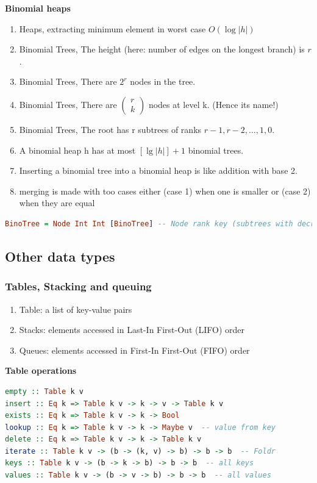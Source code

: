 \noindent\textbf{Binomial heaps}
\begin{enumerate}
\item  Heaps, extracting minimum element in worst case $O(\log{|h|})$
\item  Binomial Trees, The height (here: number of edges on the longest branch) is $r$.
\item  Binomial Trees, There are $2^r$ nodes in the tree.
\item  Binomial Trees, There are $\left(\begin{array}{l}{r}\\{k}\end{array}\right)$ nodes at level k.
  (Hence its name!)
\item  Binomial Trees, The root has r subtrees of ranks $r-1,r-2,\ldots,1,0$.
\item  A binomial heap h has at most $[\lg|h|]+1$ binomial trees.
\item  Inserting a binomial tree into a binomial heap is like addition with base 2.
\item  merging is made with too cases either (case 1) when one is smaller or (case 2) when they are equal
\end{enumerate}

\begin{lstlisting}[language=Haskell]
  BinoTree = Node Int Int [BinoTree] -- Node rank key (subtrees with decreasing rank)
\end{lstlisting}

\subsection{Other data types}
\subsubsection{Tables, Stacking and queuing}
\begin{enumerate}
\item  Table: a list of key-value pairs
\item  Stacks: elements accessed in Last-In First-Out (LIFO) order
\item  Queues: elements accessed in First-In First-Out (FIFO) order
\end{enumerate}

\noindent\textbf{Table operations}
\begin{lstlisting}[language=Haskell]
empty :: Table k v
insert :: Eq k => Table k v -> k -> v -> Table k v
exists :: Eq k => Table k v -> k -> Bool
lookup :: Eq k => Table k v -> k -> Maybe v  -- value from key
delete :: Eq k => Table k v -> k -> Table k v
iterate :: Table k v -> (b -> (k, v) -> b) -> b -> b  -- Foldr
keys :: Table k v -> (b -> k -> b) -> b -> b  -- all keys
values :: Table k v -> (b -> v -> b) -> b -> b  -- all values
\end{lstlisting}
 

